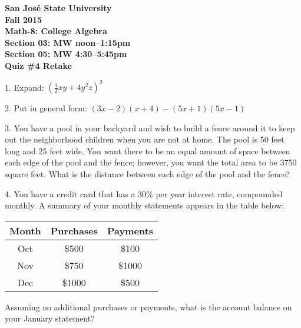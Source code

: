 \documentclass[letterpaper, 12pt]{article}
\begin{document}
\begin{center}
\bfseries
San Jos\'{e} State University \\
Fall 2015 \\
Math-8: College Algebra \\
Section 03: MW noon--1:15pm \\
Section 05: MW 4:30--5:45pm \\
\bigskip
Quiz \#4 Retake
\end{center}

\bigskip

1. Expand: $(\frac{1}{2}xy+4y^2z)^2$

\vspace{3in}

2. Put in general form: $(3x-2)(x+4)-(5x+1)(5x-1)$

\newpage

3. You have a pool in your backyard and wish to build a fence around it to keep
out the neighborhood children when you are not at home.  The pool is 50 feet
long and 25 feet wide.  You want there to be an equal amount of space between
each edge of the pool and the fence; however, you want the total area to be
3750 square feet.  What is the distance between each edge of the pool and the
fence?

\vspace{3in}

4. You have a credit card that has a 30\% per year interest rate, compounded
monthly. A summary of your monthly statements appears in the table below:

\bigskip

\begin{tabular}{|c|c|c|}
\hline
Month & Purchases & Payments \\
\hline
Oct & \$500 & \$100 \\
\hline
Nov & \$750 & \$1000 \\
\hline
Dec & \$1000 & \$500 \\
\hline
\end{tabular}

\bigskip

Assuming no additional purchases or payments, what is the account balance on
your January statement?
\end{document}
